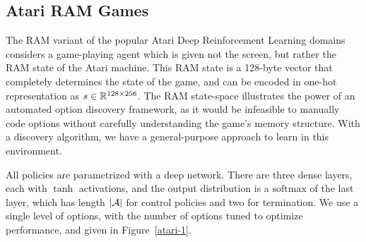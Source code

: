 

\subsection*{Atari RAM Games}
The RAM variant of the popular Atari Deep Reinforcement Learning domains considers a game-playing agent which is given not the screen, but rather the RAM state of the Atari machine.
This RAM state is a 128-byte vector that completely determines the state of the game, and can be encoded in one-hot representation as $s\in\mathbb{R}^{128 \times 256}$.
The RAM state-space illustrates the power of an automated option discovery framework, as it would be infeasible to manually code options without carefully understanding the game's memory structure.
With a discovery algorithm, we have a general-purpose approach to learn in this environment.

All policies are parametrized with a deep network. There are three dense layers, each with $\tanh$ activations, and the output distribution is a $\mathrm{softmax}$ of the last layer, which has length $|\mathcal{A}|$ for control policies and two for termination. We use a single level of options, with the number of options tuned to optimize performance, and given in Figure~\ref{atari-1}.

